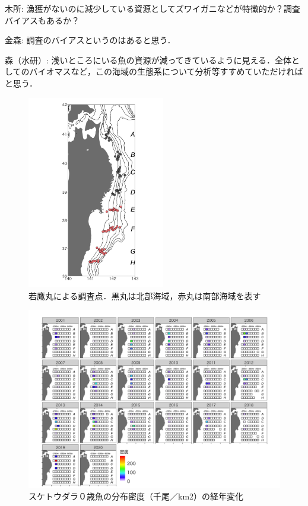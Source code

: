 \documentclass[11pt]{article} %
\begin{document}
\begin{linenumbers}
木所: 漁獲がないのに減少している資源としてズワイガニなどが特徴的か？調査バイアスもあるか？

金森: 調査のバイアスというのはあると思う．

森（水研）: 浅いところにいる魚の資源が減ってきているように見える．全体としてのバイオマスなど，この海域の生態系について分析等すすめていただければと思う．

\begin{figure}[h]
  \centering
  \includegraphics[width = 6cm]{fig1.png}
  \caption{若鷹丸による調査点．黒丸は北部海域，赤丸は南部海域を表す}
\end{figure}

\begin{figure}[h]
  \centering
  \includegraphics[width = 14cm]{スケトウダラ０＋dens.png}
  \caption{スケトウダラ０歳魚の分布密度（千尾／km2）の経年変化}
\end{figure}


\end{linenumbers}
\end{document}
